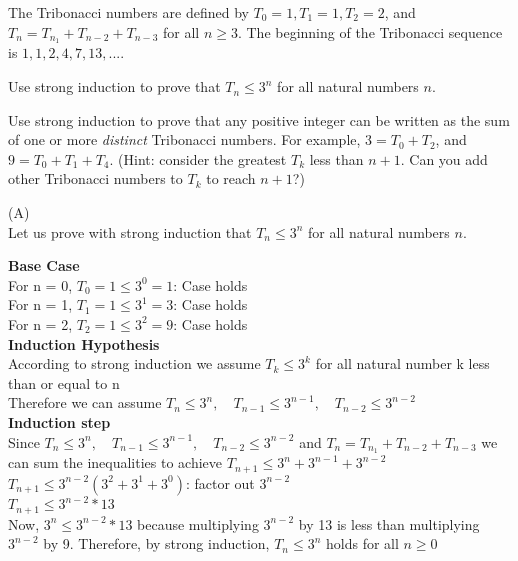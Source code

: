 \documentclass[solution,letterpaper]{cs20}
\begin{document}
    \begin{problem}
        The Tribonacci numbers are defined by $T_0 = 1, T_1 = 1, T_2 = 2$, and $T_n = T_{n_1} + T_{n-2} + T_{n-3}$ for all $n \ge 3$. The beginning of the Tribonacci sequence is $1, 1, 2, 4, 7, 13, ...$.

        \subproblem Use strong induction to prove that $T_n \le 3^n$ for all natural numbers $n$.

        \subproblem Use strong induction to prove that any positive integer can be written as the sum of one or more \textit{distinct} Tribonacci numbers. For example, $3 = T_0 + T_2$, and $9 = T_0 + T_1 + T_4$. (Hint: consider the greatest $T_k$ less than $n+1$. Can you add other Tribonacci numbers to $T_k$ to reach $n+1$?)

        \begin{solution}
        (A) \\
        Let us prove with strong induction that $T_n \le 3^n$ for all natural numbers $n$.

        \textbf{Base Case} \\
        For n = 0, $T_0 = 1 \leq 3^0 = 1$: Case holds\\
        For n = 1, $T_1 = 1 \leq 3^1 = 3$: Case holds \\
        For n = 2, $T_2 = 1 \leq 3^2 = 9$: Case holds \\

        \textbf{Induction Hypothesis} \\
        According to strong induction we assume $T_k \leq 3^k$ for all natural number k less than or equal to n \\
        Therefore we can assume $T_n \leq 3^n, \quad T_{n-1} \leq 3^{n-1}, \quad T_{n-2} \leq 3^{n-2}$ \\

        \textbf{Induction step} \\
        Since $T_n \leq 3^n, \quad T_{n-1} \leq 3^{n-1}, \quad T_{n-2} \leq 3^{n-2}$ and $T_n = T_{n_1} + T_{n-2} + T_{n-3}$ we can sum the inequalities to achieve
        $T_{n+1} \leq 3^n + 3^{n-1} + 3^{n-2}$ \\
        $T_{n+1} \leq 3^{n-2} (3^2 + 3^1 + 3^0)$: factor out $3^{n-2}$ \\
        $T_{n+1} \leq 3^{n-2} * 13$ \\

        Now, $3^n \leq 3^{n-2} * 13$ because multiplying $3^{n-2}$ by 13 is less than multiplying $3^{n-2}$ by 9. Therefore, by  strong induction, $T_n \leq 3^n$ holds for all $n \geq 0$ \qedsymbol \\


\end{solution}
\end{problem}
\end{document}
